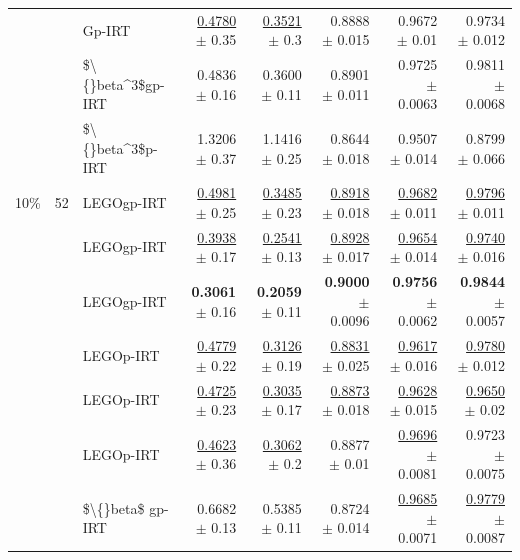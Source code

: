 \begin{longtable}{llp{}rrrrr}
 &  & Gp-IRT & \underline{0.4780} {\scriptsize $\pm$ 0.35} & \underline{0.3521} {\scriptsize $\pm$ 0.3} & 0.8888 {\scriptsize $\pm$ 0.015} & 0.9672 {\scriptsize $\pm$ 0.01} & 0.9734 {\scriptsize $\pm$ 0.012} \\
 &  & \$\textbackslash\{\}beta\textasciicircum{}3\$gp-IRT & 0.4836 {\scriptsize $\pm$ 0.16} & 0.3600 {\scriptsize $\pm$ 0.11} & 0.8901 {\scriptsize $\pm$ 0.011} & 0.9725 {\scriptsize $\pm$ 0.0063} & 0.9811 {\scriptsize $\pm$ 0.0068} \\
 &  & \$\textbackslash\{\}beta\textasciicircum{}3\$p-IRT & 1.3206 {\scriptsize $\pm$ 0.37} & 1.1416 {\scriptsize $\pm$ 0.25} & 0.8644 {\scriptsize $\pm$ 0.018} & 0.9507 {\scriptsize $\pm$ 0.014} & 0.8799 {\scriptsize $\pm$ 0.066} \\
\midrule
10\% & 52 & LEGOgp-IRT & \underline{0.4981} {\scriptsize $\pm$ 0.25} & \underline{0.3485} {\scriptsize $\pm$ 0.23} & \underline{0.8918} {\scriptsize $\pm$ 0.018} & \underline{0.9682} {\scriptsize $\pm$ 0.011} & \underline{0.9796} {\scriptsize $\pm$ 0.011} \\
 &  & LEGOgp-IRT & \underline{0.3938} {\scriptsize $\pm$ 0.17} & \underline{0.2541} {\scriptsize $\pm$ 0.13} & \underline{0.8928} {\scriptsize $\pm$ 0.017} & \underline{0.9654} {\scriptsize $\pm$ 0.014} & \underline{0.9740} {\scriptsize $\pm$ 0.016} \\
 &  & LEGOgp-IRT & \textbf{0.3061} {\scriptsize $\pm$ 0.16} & \textbf{0.2059} {\scriptsize $\pm$ 0.11} & \textbf{0.9000} {\scriptsize $\pm$ 0.0096} & \textbf{0.9756} {\scriptsize $\pm$ 0.0062} & \textbf{0.9844} {\scriptsize $\pm$ 0.0057} \\
 &  & LEGOp-IRT & \underline{0.4779} {\scriptsize $\pm$ 0.22} & \underline{0.3126} {\scriptsize $\pm$ 0.19} & \underline{0.8831} {\scriptsize $\pm$ 0.025} & \underline{0.9617} {\scriptsize $\pm$ 0.016} & \underline{0.9780} {\scriptsize $\pm$ 0.012} \\
 &  & LEGOp-IRT & \underline{0.4725} {\scriptsize $\pm$ 0.23} & \underline{0.3035} {\scriptsize $\pm$ 0.17} & \underline{0.8873} {\scriptsize $\pm$ 0.018} & \underline{0.9628} {\scriptsize $\pm$ 0.015} & \underline{0.9650} {\scriptsize $\pm$ 0.02} \\
 &  & LEGOp-IRT & \underline{0.4623} {\scriptsize $\pm$ 0.36} & \underline{0.3062} {\scriptsize $\pm$ 0.2} & 0.8877 {\scriptsize $\pm$ 0.01} & \underline{0.9696} {\scriptsize $\pm$ 0.0081} & 0.9723 {\scriptsize $\pm$ 0.0075} \\
 &  & \$\textbackslash\{\}beta\$ gp-IRT & 0.6682 {\scriptsize $\pm$ 0.13} & 0.5385 {\scriptsize $\pm$ 0.11} & 0.8724 {\scriptsize $\pm$ 0.014} & \underline{0.9685} {\scriptsize $\pm$ 0.0071} & \underline{0.9779} {\scriptsize $\pm$ 0.0087} \\

\end{longtable}
